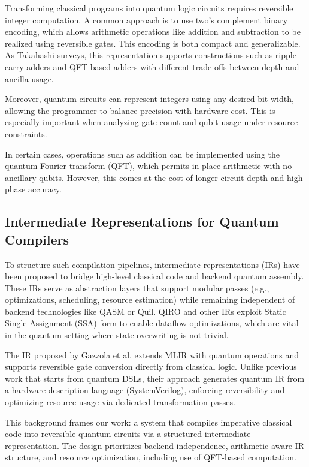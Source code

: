 \documentclass[conference]{IEEEtran}
\begin{document}
Transforming classical programs into quantum logic circuits requires reversible integer computation. A common approach is to use two's complement binary encoding, which allows arithmetic operations like addition and subtraction to be realized using reversible gates. This encoding is both compact and generalizable. As Takahashi surveys, this representation supports constructions such as ripple-carry adders and QFT-based adders with different trade-offs between depth and ancilla usage. %

Moreover, quantum circuits can represent integers using any desired bit-width, allowing the programmer to balance precision with hardware cost. This is especially important when analyzing gate count and qubit usage under resource constraints. %

In certain cases, operations such as addition can be implemented using the quantum Fourier transform (QFT), which permits in-place arithmetic with no ancillary qubits. However, this comes at the cost of longer circuit depth and high phase accuracy. %

\subsection{Intermediate Representations for Quantum Compilers}

To structure such compilation pipelines, intermediate representations (IRs) have been proposed to bridge high-level classical code and backend quantum assembly. These IRs serve as abstraction layers that support modular passes (e.g., optimizations, scheduling, resource estimation) while remaining independent of backend technologies like QASM or Quil. QIRO and other IRs exploit Static Single Assignment (SSA) form to enable dataflow optimizations, which are vital in the quantum setting where state overwriting is not trivial. %

The IR proposed by Gazzola et al. extends MLIR with quantum operations and supports reversible gate conversion directly from classical logic. Unlike previous work that starts from quantum DSLs, their approach generates quantum IR from a hardware description language (SystemVerilog), enforcing reversibility and optimizing resource usage via dedicated transformation passes. %

\vspace{1em}

This background frames our work: a system that compiles imperative classical code into reversible quantum circuits via a structured intermediate representation. The design prioritizes backend independence, arithmetic-aware IR structure, and resource optimization, including  use of QFT-based computation.
\end{document}

